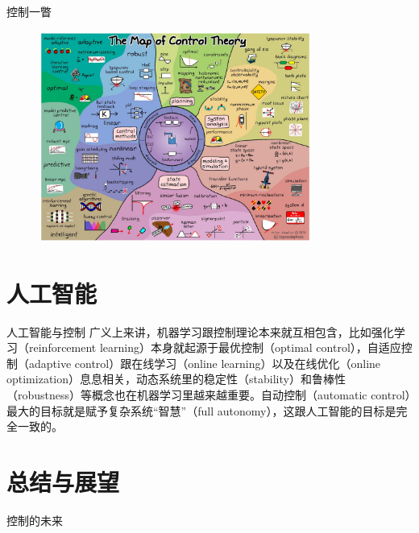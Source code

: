 \documentclass[10pt]{ctexbeamer}
\begin{document}
\begin{frame}{控制一瞥}
  \begin{figure}
    \includegraphics[width=0.8\textwidth]{pic/map_of_control.jpeg}
  \end{figure}
\end{frame}

\section{人工智能}

\begin{frame}{人工智能与控制}
  广义上来讲，机器学习跟控制理论本来就互相包含，比如强化学习（reinforcement learning）本身就起源于最优控制（optimal control），自适应控制（adaptive control）跟在线学习（online learning）以及在线优化（online optimization）息息相关，动态系统里的稳定性（stability）和鲁棒性（robustness）等概念也在机器学习里越来越重要。自动控制（automatic control）最大的目标就是赋予复杂系统“智慧”（full autonomy），这跟人工智能的目标是完全一致的。
\end{frame}

\section{总结与展望}
    \begin{frame}{控制的未来}
    \end{frame}
\end{document}
